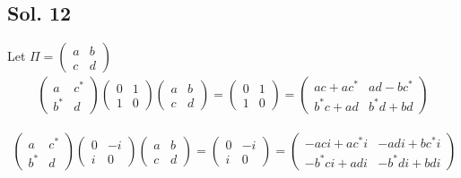 \subsection*{Sol. 12}
Let $\Pi = \begin{pmatrix}
a & b\\ c & d
\end{pmatrix}$
\begin{align*}
    \begin{pmatrix}
a & c^*\\ b^* & d
\end{pmatrix}
\begin{pmatrix}
0 & 1 \\ 1 & 0
\end{pmatrix}
\begin{pmatrix}
a & b\\ c & d
\end{pmatrix}
=\begin{pmatrix}
0 & 1 \\ 1 & 0
\end{pmatrix}
=
\begin{pmatrix}
ac+ac^* & ad-bc^* \\ b^*c+ad & b^*d+bd
\end{pmatrix}
\end{align*}

\begin{align*}
    \begin{pmatrix}
a & c^*\\ b^* & d
\end{pmatrix}
\begin{pmatrix}
0 & -i \\ i & 0
\end{pmatrix}
\begin{pmatrix}
a & b\\ c & d
\end{pmatrix}
=\begin{pmatrix}
0 & -i \\ i & 0
\end{pmatrix}
=\begin{pmatrix}
-aci+ac^*i & -adi+bc^*i \\ -b^*ci+adi & -b^*di+bdi
\end{pmatrix}
\end{align*}

